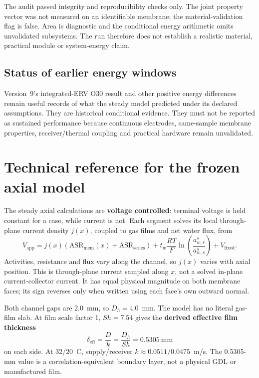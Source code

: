 \documentclass[10pt,a4paper]{article}
\begin{document}
The audit passed integrity and reproducibility checks only. The joint property
vector was not measured on an identifiable membrane; the material-validation
flag is false. Area is diagnostic and the conditional energy arithmetic omits
unvalidated subsystems. The run therefore does not establish a realistic
material, practical module or system-energy claim.

\subsection{Status of earlier energy windows}

Version~9's integrated-ERV O30 result and other positive energy differences
remain useful records of what the steady model predicted under its declared
assumptions. They are historical conditional evidence. They must not be
reported as sustained performance because continuous electrodes, same-sample
membrane properties, receiver/thermal coupling and practical hardware remain
unvalidated.

\clearpage
\section{Technical reference for the frozen axial model}

The steady axial calculations are \textbf{voltage controlled}: terminal
voltage is held constant for a case, while current is not. Each segment solves
its local through-plane current density \(j(x)\), coupled to gas films and net
water flux, from
\[
V_{\mathrm{app}}=j(x)\!\left(\mathrm{ASR}_{\mathrm{mem}}(x)+
\mathrm{ASR}_{\mathrm{series}}\right)
+t_w\frac{RT}{F}\ln\!\left(\frac{a_{w,r}^{s}}{a_{w,s}^{s}}\right)
+V_{\mathrm{fixed}}.
\]
Activities, resistance and flux vary along the channel, so \(j(x)\) varies
with axial position. This is through-plane current sampled along \(x\), not a
solved in-plane current-collector current. It has equal physical magnitude on
both membrane faces; its sign reverses only when written using each face's own
outward normal.

Both channel gaps are 2.0~mm, so \(D_h=4.0\)~mm. The model has no literal
gas-film slab. At film scale factor 1, \(Sh=7.54\) gives the \textbf{derived
effective film thickness}
\[
\delta_{\mathrm{eff}}=\frac{D}{k}=\frac{D_h}{Sh}=0.5305\ \mathrm{mm}
\]
on each side. At 32/20~\textdegree C, supply/receiver
\(k\approx0.0511/0.0475\)~m/s. The 0.5305-mm value is a correlation-equivalent
boundary layer, not a physical GDL or manufactured film.
\end{document}
